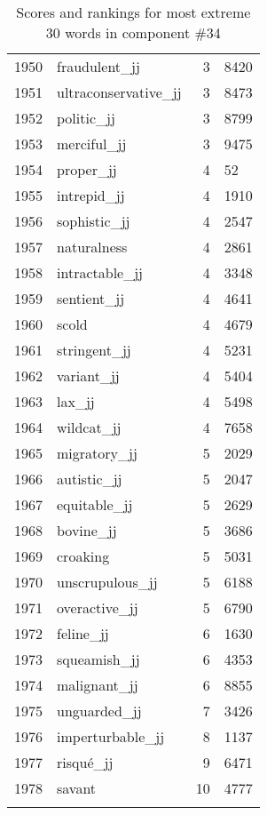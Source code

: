\begin{longtable}[!htbp]{| rlr@{.}l |}
    1950 & fraudulent\_jj & 3 & 8420 \\
    1951 & ultraconservative\_jj & 3 & 8473 \\
    1952 & politic\_jj & 3 & 8799 \\
    1953 & merciful\_jj & 3 & 9475 \\
    1954 & proper\_jj & 4 & 52 \\
    1955 & intrepid\_jj & 4 & 1910 \\
    1956 & sophistic\_jj & 4 & 2547 \\
    1957 & naturalness & 4 & 2861 \\
    1958 & intractable\_jj & 4 & 3348 \\
    1959 & sentient\_jj & 4 & 4641 \\
    1960 & scold & 4 & 4679 \\
    1961 & stringent\_jj & 4 & 5231 \\
    1962 & variant\_jj & 4 & 5404 \\
    1963 & lax\_jj & 4 & 5498 \\
    1964 & wildcat\_jj & 4 & 7658 \\
    1965 & migratory\_jj & 5 & 2029 \\
    1966 & autistic\_jj & 5 & 2047 \\
    1967 & equitable\_jj & 5 & 2629 \\
    1968 & bovine\_jj & 5 & 3686 \\
    1969 & croaking & 5 & 5031 \\
    1970 & unscrupulous\_jj & 5 & 6188 \\
    1971 & overactive\_jj & 5 & 6790 \\
    1972 & feline\_jj & 6 & 1630 \\
    1973 & squeamish\_jj & 6 & 4353 \\
    1974 & malignant\_jj & 6 & 8855 \\
    1975 & unguarded\_jj & 7 & 3426 \\
    1976 & imperturbable\_jj & 8 & 1137 \\
    1977 & risqué\_jj & 9 & 6471 \\
    1978 & savant & 10 & 4777 \\
    \hline
    \caption{Scores and rankings for most extreme 30 words in component \#34} \\
\end{longtable}

